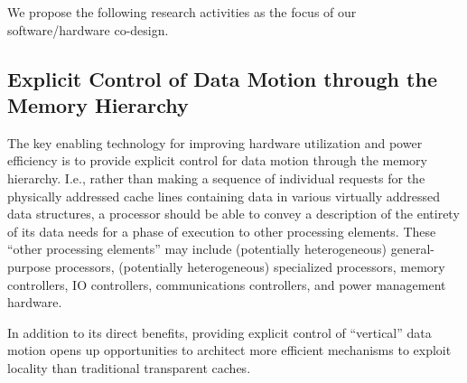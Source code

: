 \begin{comment}
  Our research program is driven by the following guidelines:
  \begin{itemize}
  \item Current hardware is inefficient in achieving its current level
    of performance; simple scaling to future needs does not appear possible.
  \item We will focus on simplified hardware that is intrinsically matched to the
    capabilities of the implementation technology: this will increase performance by decreasing 
    overhead, make the hardware more power-efficient, and leave future development as open 
    as possible. 
  \item This hardware will expose high-level data motion and synchronization mechanisms to user space.
  \item Exploiting these mechanisms will require a programming model with more
    refined semantics; these semantics will also be able to address the 
    overdecomposition and dataflow problems that threading brings with it.
  \end{itemize}
\end{comment}

We propose the following research activities as the focus of our
software/hardware co-design.

\subsection{Explicit Control of Data Motion through the Memory Hierarchy}
\label{sec:propose-data-motion}

The key enabling technology for improving hardware utilization and
power efficiency is to provide explicit control for data motion
through the memory hierarchy.  I.e., rather than making a sequence of
individual requests for the physically addressed cache lines
containing data in various virtually addressed data structures, a
processor should be able to convey a description of the entirety of
its data needs for a phase of execution to other processing elements.
These ``other processing elements'' may include (potentially
heterogeneous) general-purpose processors, (potentially heterogeneous)
specialized processors, memory controllers, IO controllers,
communications controllers, and power management hardware.

In addition to its direct benefits, providing explicit control of
``vertical'' data motion opens up opportunities to architect more
efficient mechanisms to exploit locality than traditional transparent
caches.



